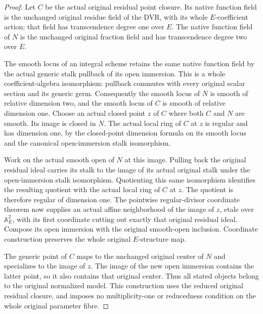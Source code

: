 \begin{proof}
Let $C$ be the actual original residual point closure. Its native function field is the unchanged original residue field of the DVR, with its whole $E$-coefficient action; that field has transcendence degree one over $E$. The native function field of $N$ is the unchanged original fraction field and has transcendence degree two over $E$.

The smooth locus of an integral scheme retains the same native function field by the actual generic stalk pullback of its open immersion. This is a whole coefficient-algebra isomorphism: pullback commutes with every original scalar section and its generic germ. Consequently the smooth locus of $N$ is smooth of relative dimension two, and the smooth locus of $C$ is smooth of relative dimension one. Choose an actual closed point $z$ of $C$ where both $C$ and $N$ are smooth. Its image is closed in $N$. The actual local ring of $C$ at $z$ is regular and has dimension one, by the closed-point dimension formula on its smooth locus and the canonical open-immersion stalk isomorphism.

Work on the actual smooth open of $N$ at this image. Pulling back the original residual ideal carries its stalk to the image of its actual original stalk under the open-immersion stalk isomorphism. Quotienting this same isomorphism identifies the resulting quotient with the actual local ring of $C$ at $z$. The quotient is therefore regular of dimension one. The pointwise regular-divisor coordinate theorem now supplies an actual affine neighborhood of the image of $z$, etale over $\mathbb A_E^2$, with its first coordinate cutting out exactly that original residual ideal. Compose its open immersion with the original smooth-open inclusion. Coordinate construction preserves the whole original $E$-structure map.

The generic point of $C$ maps to the unchanged original center of $N$ and specializes to the image of $z$. The image of the new open immersion contains the latter point, so it also contains that original center. Thus all stated objects belong to the original normalized model. This construction uses the reduced original residual closure, and imposes no multiplicity-one or reducedness condition on the whole original parameter fibre.
\end{proof}
